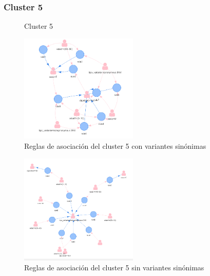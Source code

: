 \subsubsection*{Cluster 5}

\begin{figure}[H]
	\centering
	\caption{Cluster 5} \label{fig:c5}
\end{figure}

\begin{figure}[H]
	\centering
	\includegraphics[width=0.5\textwidth]{Kap4/reglas5_1}
	\caption{Reglas de asociación del cluster 5 con variantes sinónimas} \label{fig:r5}
\end{figure}

\begin{figure}[H]
	\centering
	\includegraphics[width=0.5\textwidth]{Kap4/reglas5_2}
	\caption{Reglas de asociación del cluster 5 sin variantes sinónimas} \label{fig:re5}
\end{figure}

